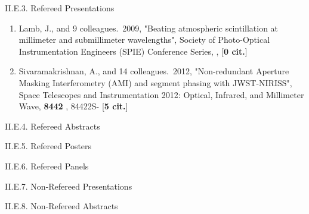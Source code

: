 \documentclass[11pt,letterpaper]{article}
\begin{document}
II.E.3. Refereed Presentations


\begin{enumerate}[resume,label=\textbf{\arabic*}.]

\item  
Lamb, J., and 9 colleagues.\  2009,  "Beating atmospheric scintillation at 
millimeter and submillimeter wavelengths", Society of Photo-Optical 
Instrumentation Engineers (SPIE) Conference Series,  ,  [{\bf 0 cit.}] 
  

\item  
Sivaramakrishnan, A., and 14 colleagues.\  2012,  "Non-redundant Aperture 
Masking Interferometry (AMI) and segment phasing with JWST-NIRISS", Space 
Telescopes and Instrumentation 2012: Optical, Infrared, and Millimeter 
Wave,  {\bf 8442} , 84422S- [{\bf 5 cit.}] 

\end{enumerate}

II.E.4. Refereed Abstracts

II.E.5. Refereed Posters

II.E.6. Refereed Panels

II.E.7. Non-Refereed Presentations

II.E.8. Non-Refereed Abstracts

\end{document}
